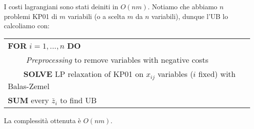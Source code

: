\documentclass[11pt]{book}
\begin{document}
I costi lagrangiani sono stati deiniti in $O(nm)$. Notiamo che
abbiamo $n$ problemi KP01 di $m$ variabili (o a scelta $m$ da $n$
variabili), dunque l'UB lo calcoliamo con:

\vspace{20pt}
\begin{tabular}{l}
\textbf{FOR} $i=1,\dots,n$ \textbf{DO}\\
$\qquad$ \textit{Preprocessing} to remove variables with negative costs\\
$\qquad$\textbf{SOLVE} LP relaxation of KP01 on $x_{ij}$ variables
($i$ fixed) with Balas-Zemel\\
\textbf{SUM} every $\bar{z}_i$ to find UB
\end{tabular}
\vspace{20pt}

La complessit\`a ottenuta \`e $O(nm)$.
\end{document}
